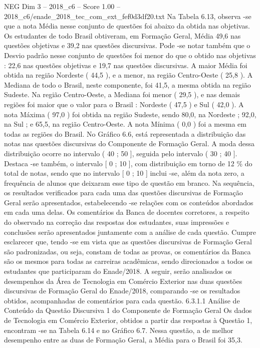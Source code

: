 \begin{textsample}{NEG Dim 3 – 2018\_c6 – Score 1.00 – 2018\_c6/enade\_2018\_tec\_com\_ext\_fef0d3df20.txt}
Na Tabela 6.13, observa -se que a nota Média nesse conjunto de questões foi abaixo da obtida nas objetivas.
Os estudantes de todo Brasil obtiveram, em Formação Geral, Média 49,6 nas questões objetivas e 39,2 nas questões discursivas.
Pode -se notar também que o Desvio padrão nesse conjunto de questões foi menor do que o obtido nas objetivas : 22,6 nas questões objetivas e 19,7 nas questões discursivas.
A maior Média foi obtida na região Nordeste ( 44,5 ), e a menor, na região Centro-Oeste ( 25,8 ).
A Mediana de todo o Brasil, neste componente, foi 41,5, a mesma obtida na região Sudeste.
Na região Centro-Oeste, a Mediana foi menor ( 29,5 ), e nas demais regiões foi maior que o valor para o Brasil : Nordeste ( 47,5 ) e Sul ( 42,0 ).
A nota Máxima ( 97,0 ) foi obtida na região Sudeste, sendo 80,0, na Nordeste ; 92,0, na Sul ; e 65,5, na região Centro-Oeste.
A nota Mínima ( 0,0 ) foi a mesma em todas as regiões do Brasil.
No Gráfico 6.6, está representada a distribuição das notas nas questões discursivas do Componente de Formação Geral.
A moda dessa distribuição ocorre no intervalo ( 40 ; 50 ], seguida pelo intervalo ( 30 ; 40 ].
Destaca -se também, o intervalo [ 0 ; 10 ], com distribuição em torno de 12 \% do total de notas, sendo que no intervalo [ 0 ; 10 ] inclui -se, além da nota zero, a frequência de alunos que deixaram esse tipo de questão em branco.
Na sequência, os resultados verificados para cada uma das questões discursivas de Formação Geral serão apresentados, estabelecendo -se relações com os conteúdos abordados em cada uma delas.
Os comentários da Banca de docentes corretores, a respeito do observado na correção das respostas dos estudantes, suas impressões e conclusões serão apresentados juntamente com a análise de cada questão.
Cumpre esclarecer que, tendo -se em vista que as questões discursivas de Formação Geral são padronizadas, ou seja, constam de todas as provas, os comentários da Banca são os mesmos para todas as carreiras acadêmicas, sendo direcionados a todos os estudantes que participaram do Enade/2018.
A seguir, serão analisados os desempenhos da Área de Tecnologia em Comércio Exterior nas duas questões discursivas de Formação Geral do Enade/2018, comparando -se os resultados obtidos, acompanhadas de comentários para cada questão. 6.3.1.1 Análise de Conteúdo da Questão Discursiva 1 do Componente de Formação Geral Os dados de Tecnologia em Comércio Exterior, obtidos a partir das respostas à Questão 1, encontram -se na Tabela 6.14 e no Gráfico 6.7.
Nessa questão, a de melhor desempenho entre as duas de Formação Geral, a Média para o Brasil foi 35,3.

\end{textsample}
